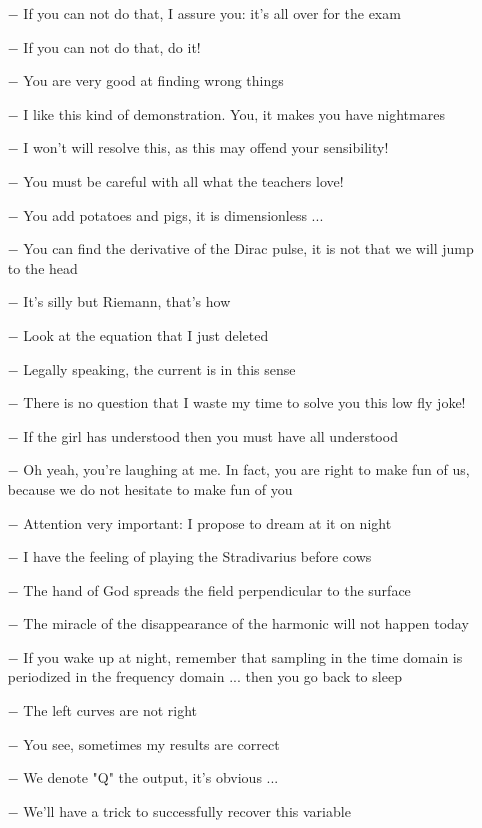 \begin{itemize}
	\item[$-$] If you can not do that, I assure you: it's all over for the exam
	\item[$-$] If you can not do that, do it!
	\item[$-$] You are very good at finding wrong things 
	\item[$-$] I like this kind of demonstration. You, it makes you have nightmares
	\item[$-$] I won't will resolve this, as this may offend your sensibility! 
	\item[$-$] You must be careful with all what the teachers love!
	\item[$-$] You add potatoes and pigs, it is dimensionless ...
	\item[$-$] You can find the derivative of the Dirac pulse, it is not that we will jump to the head
	\item[$-$] It's silly but Riemann, that's how
	\item[$-$] Look at the equation that I just deleted
	\item[$-$] Legally speaking, the current is in this sense
	\item[$-$] There is no question that I waste my time to solve you this low fly joke! 
	\item[$-$] If the girl has understood then you must have all understood
	\item[$-$] Oh yeah, you're laughing at me. In fact, you are right to make fun of us, because we do not hesitate to make fun of you 
	\item[$-$] Attention very important: I propose to dream at it on night
	\item[$-$] I have the feeling of playing the Stradivarius before cows
	\item[$-$] The hand of God spreads the field perpendicular to the surface
	\item[$-$] The miracle of the disappearance of the harmonic will not happen today
	\item[$-$] If you wake up at night, remember that sampling in the time domain is periodized in the frequency domain ... then you go back to sleep 
	\item[$-$] The left curves are not right
	\item[$-$] You see, sometimes my results are correct
	\item[$-$] We denote "Q" the output, it's obvious ...
	\item[$-$] We'll have a trick to successfully recover this variable

\end{itemize}
